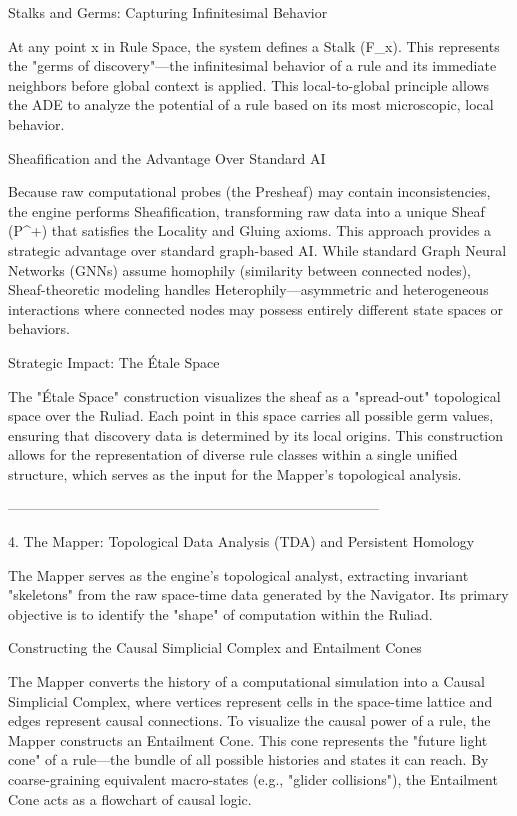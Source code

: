 Stalks and Germs: Capturing Infinitesimal Behavior

At any point x in Rule Space, the system defines a Stalk (F_x). This represents the "germs of discovery"—the infinitesimal behavior of a rule and its immediate neighbors before global context is applied. This local-to-global principle allows the ADE to analyze the potential of a rule based on its most microscopic, local behavior.

Sheafification and the Advantage Over Standard AI

Because raw computational probes (the Presheaf) may contain inconsistencies, the engine performs Sheafification, transforming raw data into a unique Sheaf (P^+) that satisfies the Locality and Gluing axioms. This approach provides a strategic advantage over standard graph-based AI. While standard Graph Neural Networks (GNNs) assume homophily (similarity between connected nodes), Sheaf-theoretic modeling handles Heterophily—asymmetric and heterogeneous interactions where connected nodes may possess entirely different state spaces or behaviors.

Strategic Impact: The Étale Space

The "Étale Space" construction visualizes the sheaf as a "spread-out" topological space over the Ruliad. Each point in this space carries all possible germ values, ensuring that discovery data is determined by its local origins. This construction allows for the representation of diverse rule classes within a single unified structure, which serves as the input for the Mapper’s topological analysis.


--------------------------------------------------------------------------------


4. The Mapper: Topological Data Analysis (TDA) and Persistent Homology

The Mapper serves as the engine’s topological analyst, extracting invariant "skeletons" from the raw space-time data generated by the Navigator. Its primary objective is to identify the "shape" of computation within the Ruliad.

Constructing the Causal Simplicial Complex and Entailment Cones

The Mapper converts the history of a computational simulation into a Causal Simplicial Complex, where vertices represent cells in the space-time lattice and edges represent causal connections. To visualize the causal power of a rule, the Mapper constructs an Entailment Cone. This cone represents the "future light cone" of a rule—the bundle of all possible histories and states it can reach. By coarse-graining equivalent macro-states (e.g., "glider collisions"), the Entailment Cone acts as a flowchart of causal logic.


